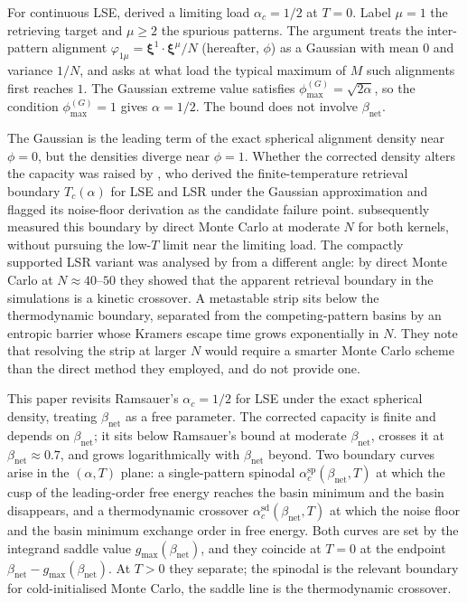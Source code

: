 \documentclass[11pt]{article}
\newcommand{\bxi}{\boldsymbol{\xi}}
\newcommand{\Bnet}{\beta_{\mathrm{net}}}
\newcommand{\gmax}{g_{\max}}
\newcommand{\acSd}{\alpha_c^{\mathrm{sd}}}
\newcommand{\acSp}{\alpha_c^{\mathrm{sp}}}
\begin{document}
For continuous LSE, \citet{ramsauer2021hopfield} derived a limiting
load $\alpha_c = 1/2$ at $T = 0$.  Label $\mu = 1$ the retrieving
target and $\mu \geq 2$ the spurious patterns.  The argument treats the
inter-pattern alignment $\varphi_{1\mu} = \bxi^1 \cdot \bxi^\mu / N$
(hereafter, $\phi$) as a Gaussian with mean $0$ and variance $1/N$, and asks at
what load the typical maximum of $M$ such alignments first reaches $1$.  The Gaussian extreme value
satisfies $\phi_{\max}^{(G)} = \sqrt{2\alpha}$, so the condition
$\phi_{\max}^{(G)} = 1$ gives $\alpha = 1/2$.  The bound does not
involve $\Bnet$.

The Gaussian is the leading term of the exact spherical alignment density
near $\phi = 0$, but the densities diverge near $\phi = 1$.
Whether the corrected density alters the capacity was raised by
\citet{icml2026theory}, who derived the finite-temperature retrieval
boundary $T_c(\alpha)$ for LSE and LSR under the Gaussian approximation
and flagged its noise-floor derivation as the candidate failure point.
\citet{iclr2026mc} subsequently measured this boundary by direct Monte
Carlo at moderate $N$ for both kernels, without pursuing the low-$T$
limit near the limiting load.  The compactly supported LSR variant was
analysed by \citet{petrova2026metastable} from a different angle: by
direct Monte Carlo at $N \approx 40$--$50$ they showed that the apparent
retrieval boundary in the simulations is a kinetic crossover.  A
metastable strip sits below the thermodynamic boundary, separated from
the competing-pattern basins by an entropic barrier whose Kramers escape
time grows exponentially in $N$.  They note that resolving the strip at
larger $N$ would require a smarter Monte Carlo scheme than the direct
method they employed, and do not provide one.

This paper revisits Ramsauer's $\alpha_c = 1/2$ for LSE under the exact
spherical density, treating $\Bnet$ as a free parameter.  The corrected
capacity is finite and depends on $\Bnet$; it sits below Ramsauer's
bound at moderate $\Bnet$, crosses it at $\Bnet \approx 0.7$, and grows
logarithmically with $\Bnet$ beyond.  Two boundary curves arise in the
$(\alpha, T)$ plane: a single-pattern spinodal $\acSp(\Bnet, T)$ at
which the cusp of the leading-order free energy reaches the basin
minimum and the basin disappears, and a thermodynamic crossover
$\acSd(\Bnet, T)$ at which the noise floor and the basin minimum
exchange order in free energy.  Both curves are set by the integrand
saddle value $\gmax(\Bnet)$, and they coincide at $T = 0$ at the
endpoint $\Bnet - \gmax(\Bnet)$.  At $T > 0$ they separate; the
spinodal is the relevant boundary for cold-initialised Monte Carlo,
the saddle line is the thermodynamic crossover.
\end{document}
